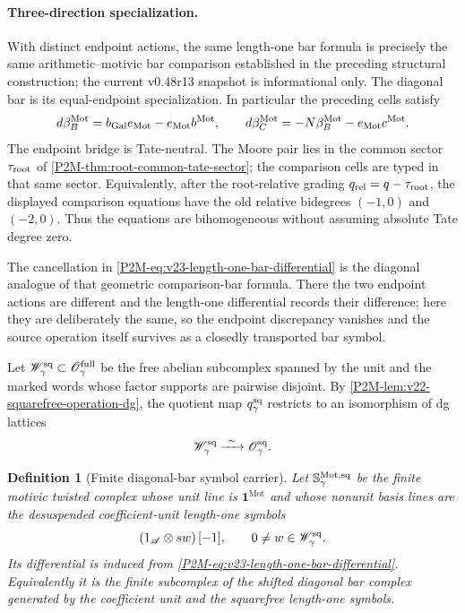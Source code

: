 \documentclass[11pt]{article}
\newtheorem{definition}[theorem]{Definition}
\theoremstyle{remark}
\newcommand{\Mot}{\mathrm{Mot}}
\begin{document}
\paragraph{Three-direction specialization.}
With distinct endpoint actions, the same length-one bar formula is precisely
the same arithmetic--motivic bar comparison established in the preceding structural construction; the
current v0.48r13 snapshot is informational only.  The diagonal bar is its
equal-endpoint specialization.  In particular the preceding cells satisfy
\[
 d\beta_B^{\Mot}=b_{\rm Gal}e_{\Mot}-e_{\Mot}b^{\Mot},
 \qquad
 d\beta_C^{\Mot}=-N\beta_B^{\Mot}-e_{\Mot}c^{\Mot}.
\]
The endpoint bridge is Tate-neutral.  The Moore pair lies in the common sector
$\tau_{\rm root}$ of \cref{P2M-thm:root-common-tate-sector}; the comparison cells
are typed in that same sector.  Equivalently, after the root-relative grading
$q_{\rm rel}=q-\tau_{\rm root}$, the displayed comparison equations have the
old relative bidegrees $(-1,0)$ and $(-2,0)$.  Thus the equations are
bihomogeneous without assuming absolute Tate degree zero.

The cancellation in \eqref{P2M-eq:v23-length-one-bar-differential} is the diagonal
analogue of that geometric comparison-bar formula.  There the two endpoint
actions are different and the length-one differential records their
difference; here they are deliberately the same, so the endpoint discrepancy
vanishes and the source operation itself survives as a closedly transported
bar symbol.

Let \(\mathscr W_\gamma^{\rm sq}\subset
\mathscr O_\gamma^{\rm full}\) be the free abelian subcomplex spanned by the
unit and the marked words whose factor supports are pairwise disjoint.  By
\cref{P2M-lem:v22-squarefree-operation-dg}, the quotient map
\(q_\gamma^{\rm sq}\) restricts to an isomorphism of dg lattices
\begin{equation}\label{P2M-eq:v23-squarefree-representative-lattice}
 \mathscr W_\gamma^{\rm sq}
 \xrightarrow{\ \sim\ }
 \mathscr O_\gamma^{\rm sq}.
\end{equation}

\begin{definition}[Finite diagonal-bar symbol carrier]
\label{P2M-def:v23-bar-symbol-carrier}
Let \(\mathbb S_\gamma^{\Mot,\rm sq}\) be the finite motivic twisted complex
whose unit line is \(\mathbf1^{\Mot}\) and whose nonunit basis lines are the
desuspended coefficient-unit length-one symbols
\[
 \left(1_{\mathscr A}\otimes sw\right)[-1],
 \qquad
 0\ne w\in\mathscr W_\gamma^{\rm sq}.
\]
Its differential is induced from
\eqref{P2M-eq:v23-length-one-bar-differential}.  Equivalently it is the finite
subcomplex of the shifted diagonal bar complex generated by the coefficient
unit and the squarefree length-one symbols.
\end{definition}
\end{document}
